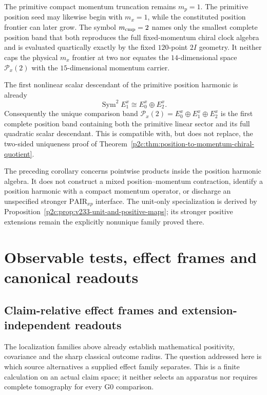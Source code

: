 \documentclass[12pt,a4paper]{article}
\begin{document}
\begin{remark}
\label{p2c:rem:v180-mp1-mcmp2-scope}
The primitive compact momentum truncation remains $m_p=1$.  The primitive
position seed may likewise begin with $m_x=1$, while the constituted position
frontier can later grow.  The symbol $m_{\rm cmp}=2$ names only the smallest
complete position band that both reproduces the full fixed-momentum chiral
clock algebra and is evaluated quartically exactly by the fixed $120$-point
$2I$ geometry.  It neither caps the physical $m_x$ frontier at two nor
equates the $14$-dimensional space $\mathcal P_x(2)$ with the
$15$-dimensional momentum carrier.
\end{remark}

\begin{corollary}
\label{p2c:cor:v191-quadratic-comparison-specialization}
The first nonlinear scalar descendant of the primitive position harmonic is
already
\[
 \operatorname{Sym}^2E_1^x\cong E_0^x\oplus E_2^x.
\]
Consequently the unique comparison band
$\mathcal P_x(2)=E_0^x\oplus E_1^x\oplus E_2^x$ is the first complete
position band containing both the primitive linear sector and its full
quadratic scalar descendant.  This is compatible with, but does not replace,
the two-sided uniqueness proof of
Theorem~\ref{p2c:thm:position-to-momentum-chiral-quotient}.
\end{corollary}

\begin{remark}
The preceding corollary concerns pointwise products inside the position
harmonic algebra.  It does not construct a mixed position--momentum
contraction, identify a position harmonic with a compact momentum operator,
or discharge an unspecified stronger $\mathrm{PAIR}_{xp}$ interface.
The unit-only specialization is derived by
Proposition~\ref{p2c:prop:v233-unit-and-positive-maps}; its stronger
positive extensions remain the explicitly nonunique family proved there.
\end{remark}


\section{Observable tests, effect frames and canonical readouts}
\label{paper2c:sec:organized-observables}

\subsection{Claim-relative effect frames and extension-independent readouts}
\label{p2c:sec:v2210-lit-effect-frames}
The localization families above already establish mathematical positivity,
covariance and the sharp classical outcome radius.  The question addressed
here is which source alternatives a supplied effect family separates.
This is a finite calculation on an actual claim space; it neither selects
an apparatus nor requires complete tomography for every G0 comparison.
\end{document}
